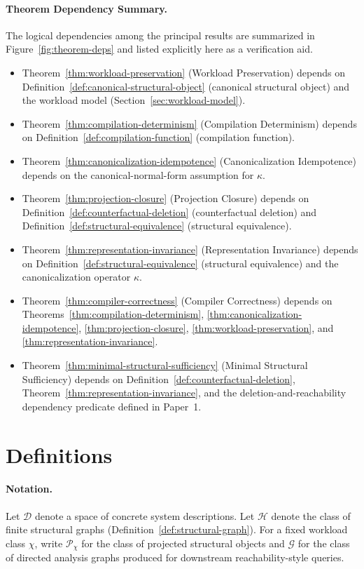 \documentclass[11pt]{article}
\begin{document}
\paragraph{Theorem Dependency Summary.}
The logical dependencies among the principal results are summarized in Figure~\ref{fig:theorem-deps} and listed explicitly here as a verification aid.
\begin{itemize}[leftmargin=*]
  \item Theorem~\ref{thm:workload-preservation} (Workload Preservation) depends on Definition~\ref{def:canonical-structural-object} (canonical structural object) and the workload model (Section~\ref{sec:workload-model}).
  \item Theorem~\ref{thm:compilation-determinism} (Compilation Determinism) depends on Definition~\ref{def:compilation-function} (compilation function).
  \item Theorem~\ref{thm:canonicalization-idempotence} (Canonicalization Idempotence) depends on the canonical-normal-form assumption for $\kappa$.
  \item Theorem~\ref{thm:projection-closure} (Projection Closure) depends on Definition~\ref{def:counterfactual-deletion} (counterfactual deletion) and Definition~\ref{def:structural-equivalence} (structural equivalence).
  \item Theorem~\ref{thm:representation-invariance} (Representation Invariance) depends on Definition~\ref{def:structural-equivalence} (structural equivalence) and the canonicalization operator $\kappa$.
  \item Theorem~\ref{thm:compiler-correctness} (Compiler Correctness) depends on Theorems~\ref{thm:compilation-determinism}, \ref{thm:canonicalization-idempotence}, \ref{thm:projection-closure}, \ref{thm:workload-preservation}, and \ref{thm:representation-invariance}.
  \item Theorem~\ref{thm:minimal-structural-sufficiency} (Minimal Structural Sufficiency) depends on Definition~\ref{def:counterfactual-deletion}, Theorem~\ref{thm:representation-invariance}, and the deletion-and-reachability dependency predicate defined in Paper~1.
\end{itemize}

\section{Definitions}
\label{sec:definitions}
\paragraph{Notation.}
Let $\mathcal{D}$ denote a space of concrete system descriptions. Let $\mathcal{H}$ denote the class of finite structural graphs (Definition~\ref{def:structural-graph}). For a fixed workload class $\chi$, write $\mathcal{P}_\chi$ for the class of projected structural objects and $\mathcal{G}$ for the class of directed analysis graphs produced for downstream reachability-style queries.
\end{document}
